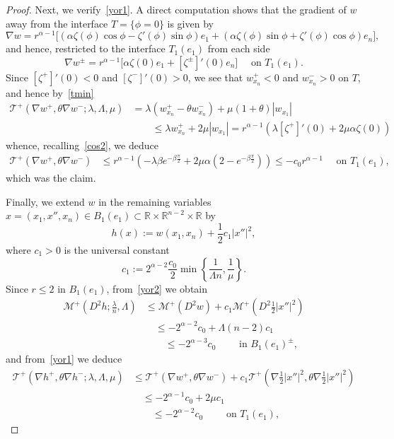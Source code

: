\documentclass[letter,11pt]{amsart}
\newcommand{\R}{\mathbb{R}}
\newcommand{\mcal}{\mathcal{M}}
\newcommand{\tcal}{\mathcal{T}}
\theoremstyle{definition}
\numberwithin{equation}{section}
\begin{document}
\begin{proof}
Next, we verify~\eqref{yor1}.
A direct computation shows that the gradient of $w$ away from the interface $T = \{\phi = 0\}$ is given by
\[
\nabla w = 
r^{\alpha-1} \Big[
\left( \alpha \zeta(\phi) \cos \phi - \zeta'(\phi) \sin \phi\right) e_1 +
\left( \alpha \zeta(\phi) \sin \phi + \zeta'(\phi) \cos \phi\right) e_n
\Big],
\]
and hence, restricted to the interface $T_1(e_1)$ from each side
\[
\nabla w^{\pm} 
= 
r^{\alpha-1} \Big[
 \alpha \zeta(0) e_1 
+[\zeta^{\pm}]'(0) e_n
\Big] \quad \text{ on } T_1(e_1).
\]
Since $[\zeta^{+}]'(0) < 0$ and $[\zeta^{-}]'(0) > 0$, we see that $w_{x_n}^{+} < 0$ and $w_{x_n}^{-} > 0$ on $T$, and hence by~\eqref{tmin}
\[
\begin{split}
\tcal^{+}(\nabla w^{+}, \theta \nabla w^{-}; \lambda, \Lambda, \mu)
&
= \lambda (w_{x_n}^{+} - \theta w_{x_n}^{-}) + \mu (1+ \theta) |w_{x_1}|\\ &  \qquad \leq \lambda w_{x_n}^{+} + 2 \mu |w_{x_1}|
= r^{\alpha-1} \left(\lambda [\zeta^{+}]'(0)  + 2\mu \alpha \zeta(0)\right)
\end{split}
\]
whence, recalling~\eqref{cos2}, we deduce
\[
\begin{split}
\tcal^{+}(\nabla w^{+}, \theta \nabla w^{-}) & \leq r^{\alpha-1} \left(
- \lambda \beta e^{-\beta\frac{\pi}{2}}  + 2\mu \alpha (2- e^{-\beta\frac{\pi}{2}})
\right) 
\leq - c_0 r^{\alpha-1} \quad \text{ on } 
T_1(e_1),
\end{split}
\]
which was the claim.

\medskip

Finally, we extend $w$ in the remaining variables $x = (x_1, x'', x_n) \in B_1(e_1) \subset \R \times \R^{n-2} \times \R$ by
\begin{equation}
\label{hfunction}
h(x) := w(x_1, x_n) + \frac{1}{2} c_1 |x''|^2, 
\end{equation}
where $c_1 > 0$ is the universal constant
\[
c_1 := 
2^{\alpha-2}
\frac{c_0}{2} \min\left\{\frac{1}{\Lambda n}, \frac{1}{\mu}\right\}.
\]
Since $r \leq 2$ in $B_1(e_1)$, from~\eqref{yor2} we obtain
\[
\begin{split}
\textstyle
\mcal^{+}(D^2 h; \frac{\lambda}{n}, \Lambda) &\leq \mcal^{+}(D^2 w) + c_1 \textstyle\mcal^{+}(D^2 \frac{1}{2} |x''|^2)\\
& \quad \leq - 2^{\alpha-2} c_0 + \Lambda(n-2) c_1 \\
& \qquad \leq - 2^{\alpha-3} c_0
\qquad  \text{ in } B_1(e_1)^{\pm},
\end{split}
\]
and from~\eqref{yor1} we deduce
\[
\begin{split}
\tcal^{+}(\nabla h^{+}, \theta \nabla h^{-}; \lambda, \Lambda, \mu) 
&\leq \tcal^{+}(\nabla w^{+}, \theta \nabla w^{-}) + c_1 \textstyle \tcal^{+}(\nabla \frac{1}{2} |x''|^2, \theta \nabla \frac{1}{2} |x''|^2)\\
& \quad \leq - 2^{\alpha-1}c_0 + 2\mu c_1\\
& \qquad \leq - 2^{\alpha-2} c_0 
\qquad \text{ on } T_1(e_1),
\end{split}
\]


\end{proof}
\end{document}
